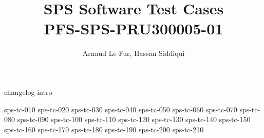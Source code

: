 \documentclass[12pt]{article}
\begin{document}
\title{\acrshort{SPS} Software Test Cases \\ \large PFS-SPS-PRU300005-01}
\author{Arnaud Le Fur, Hassan Siddiqui}
\maketitle

\tableofcontents
\newpage

%
%
{changelog}
{intro}
\newpage

%
%
{sps-tc-010}
\newpage
{sps-tc-020}
\newpage
{sps-tc-030}
\newpage
{sps-tc-040}
\newpage
{sps-tc-050}
\newpage
{sps-tc-060}
\newpage
{sps-tc-070}
\newpage
{sps-tc-080}
\newpage
{sps-tc-090}
\newpage
{sps-tc-100}
\newpage
{sps-tc-110}
\newpage
{sps-tc-120}
\newpage
{sps-tc-130}
\newpage
{sps-tc-140}
\newpage
{sps-tc-150}
\newpage
{sps-tc-160}
\newpage
{sps-tc-170}
\newpage
{sps-tc-180}
\newpage
{sps-tc-190}
\newpage
{sps-tc-200}
\newpage
{sps-tc-210}
\newpage
%
%
\printglossary[type=\acronymtype]
\printglossary
\end{document}
